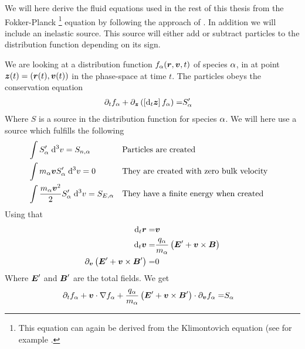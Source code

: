 We will here derive the fluid equations used in the rest of this thesis from the Fokker-Planck%
\footnote{
This equation can again be derived from the Klimontovich equation (see for example \cite{Klimontovich1983book}.
}
%
 equation by following the approach of \cite{Helander2002book}.
In addition we will include an inelastic source.
This source will either add or subtract particles to the distribution function depending on its sign.

We are looking at a distribution function $f_\alpha(\boldsymbol{r},\boldsymbol{v},t)$ of species $\alpha$, in at point $\boldsymbol{z}(t)=(\boldsymbol{r}(t),\boldsymbol{v}(t))$ in the phase-space at time $t$.
The particles obeys the conservation equation
%
\begin{align*}
    \partial_t f_\alpha + \partial_{\boldsymbol{z}} \left(\left[\text{d}_t \boldsymbol{z}\right]f_\alpha\right) =& S'_\alpha
\end{align*}
%
Where $S$ is a source in the distribution function for species $\alpha$.
We will here use a source which fulfills the following
%
\begin{align*}
    &\int {S'_{\alpha}} \; \text{d} {^3v} = S_{n,\alpha}&
    &\text{Particles are created}&
    \\
    &\int {m_\alpha\boldsymbol{v} S'_\alpha} \; \text{d} {^3v} = 0&
    &\text{They are created with zero bulk velocity}&
    \\
    &\int {\frac{m_\alpha\boldsymbol{v}^2}{2} S'_\alpha} \; \text{d} {^3v} = S_{E,\alpha}&
    &\text{They have a finite energy when created}&
\end{align*}
%
Using that
%
\begin{align*}
    \text{d}_t \boldsymbol{r}     =& \boldsymbol{v}\\
    \text{d}_t \boldsymbol{v}     =& \frac{q_\alpha}{m_\alpha}\left(\boldsymbol{E}'+\boldsymbol{v}\times\boldsymbol{B}\right)\\
    \partial_{\boldsymbol{v}} \left(\boldsymbol{E}'+\boldsymbol{v}\times\boldsymbol{B}'\right) =& 0
\end{align*}
%
Where $\boldsymbol{E}'$ and $\boldsymbol{B}'$ are the total fields.
We get
%
\begin{align*}
      \partial_t f_\alpha
    + \boldsymbol{v}\cdot\nabla f_\alpha
    + \frac{q_\alpha}{m_\alpha}
      \left(\boldsymbol{E}'+\boldsymbol{v}\times\boldsymbol{B}'\right)\cdot\partial_{\boldsymbol{v}}f_\alpha
    =& S_\alpha
\end{align*}

